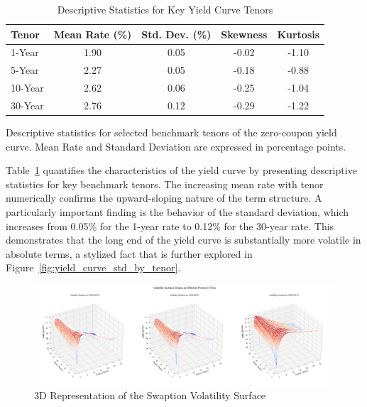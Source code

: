 \begin{table}[H]
	\centering
	\begin{threeparttable}
		\caption{Descriptive Statistics for Key Yield Curve Tenors}
		\label{tab:yield_curve_summary}
		\begin{tabular}{lcccc}
			\toprule
			\textbf{Tenor} & \textbf{Mean Rate (\%)} & \textbf{Std. Dev. (\%)} & \textbf{Skewness} & \textbf{Kurtosis} \\
			\midrule
			1-Year         & 1.90                    & 0.05                    & -0.02             & -1.10             \\
			5-Year         & 2.27                    & 0.05                    & -0.18             & -0.88             \\
			10-Year        & 2.62                    & 0.06                    & -0.25             & -1.04             \\
			30-Year        & 2.76                    & 0.12                    & -0.29             & -1.22             \\
			\bottomrule
		\end{tabular}
		\begin{tablenotes}
			\footnotesize
			\item  Descriptive statistics for selected benchmark tenors of the zero-coupon yield curve. Mean Rate and Standard Deviation are expressed in percentage points.
		\end{tablenotes}
	\end{threeparttable}
\end{table}


Table~\ref{tab:yield_curve_summary} quantifies the characteristics of the yield curve by presenting descriptive statistics for key benchmark tenors. The increasing mean rate with tenor numerically confirms the upward-sloping nature of the term structure. A particularly important finding is the behavior of the standard deviation, which increases from 0.05\% for the 1-year rate to 0.12\% for the 30-year rate. This demonstrates that the long end of the yield curve is substantially more volatile in absolute terms, a stylized fact that is further explored in Figure~\ref{fig:yield_curve_std_by_tenor}.

\begin{figure}[H]
	\centering
	\includegraphics[width=1\textwidth]{images/descriptive_data_analysis/vol_surface_3d_snapshots.png}
	\caption{3D Representation of the Swaption Volatility Surface}
	\label{fig:vol_surface_3d_snapshots}
\end{figure}

